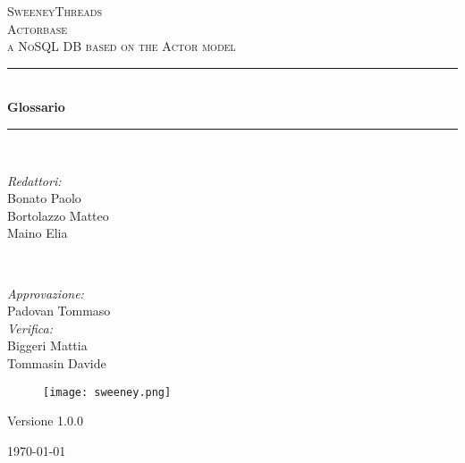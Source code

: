\documentclass[a4paper]{report}
\begin{document}
	
	\begin{titlepage}
		\newcommand{\HRule}{\rule{\linewidth}{0.5mm}} 
		\center  
		
		\textsc{\LARGE SweeneyThreads}\\[1.5cm] 
		\textsc{\Large Actorbase}\\[0.5cm] 
		\textsc{\large a NoSQL DB based on the Actor model}\\[0.5cm]
		
		
		\HRule \\[0.4cm]
		{ \huge \bfseries Glossario}\\[0.4cm] 
		\HRule \\[1.5cm]
		
		\begin{minipage}{0.4\textwidth}
			\begin{flushleft} \large
				\emph{Redattori:}\\
				Bonato Paolo \\
				Bortolazzo Matteo \\
				Maino Elia
			\end{flushleft}
		\end{minipage}
		~
		\begin{minipage}{0.4\textwidth}
			\begin{flushright} \large
				\emph{Approvazione:} \\
				Padovan Tommaso \\
				\emph{Verifica:} \\
				Biggeri Mattia \\
				Tommasin Davide 
			\end{flushright}
		\end{minipage}
		
		\begin{figure}[H]
			\centering
			\texttt{[image: sweeney.png]}
		\end{figure}
		\begin{center}
			Versione 1.0.0
		\end{center}
		{\large \today}\\[3cm] 
		\vfill  
	\end{titlepage}
	
	
	\tableofcontents
	
\end{document}
